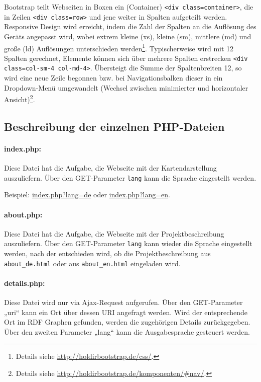 \documentclass[11pt,a4paper]{article}
\begin{document}
Bootstrap teilt Webseiten in Boxen ein (Container) \texttt{<div
  class={\dq}container{\dq}>}, die in Zeilen \texttt{<div class={\dq}row{\dq}>}
und jene weiter in Spalten aufgeteilt werden.  Responsive Design wird erreicht,
indem die Zahl der Spalten an die Auflösung des Geräts angepasst wird, wobei
extrem kleine (xs), kleine (sm), mittlere (md) und große (ld) Auflösungen
unterschieden werden\footnote{Details siehe
  \url{http://holdirbootstrap.de/css/}.}.  Typischerweise wird mit 12 Spalten
gerechnet, Elemente können sich über mehrere Spalten erstrecken \texttt{<div
  class={\dq}col-sm-4 col-md-4{\dq}>}. Übersteigt die Summe der Spaltenbreiten
12, so wird eine neue Zeile begonnen bzw. bei Navigationsbalken dieser in ein
Dropdown-Menü umgewandelt (Wechsel zwischen minimierter und horizontaler
Ansicht)\footnote{Details siehe
  \url{http://holdirbootstrap.de/komponenten/#nav/}.}.

\subsection{Beschreibung der einzelnen PHP-Dateien}
\paragraph{index.php:} 
Diese Datei hat die Aufgabe, die Webseite mit der Kartendarstellung
auszuliefern.  Über den GET-Parameter \texttt{lang} kann die Sprache eingestellt
werden. 

Beispiel: \url{index.php?lang=de} oder \url{index.php?lang=en}.

\paragraph{about.php:} 
Diese Datei hat die Aufgabe, die Webseite mit der Projektbeschreibung
auszuliefern.  Über den GET-Parameter \texttt{lang} kann wieder die Sprache
eingestellt werden, nach der entschieden wird, ob die Projektbeschreibung aus
\texttt{about\_de.html} oder aus \texttt{about\_en.html} eingeladen wird.

\paragraph{details.php:} 
Diese Datei wird nur via Ajax-Request aufgerufen. Über den GET-Parameter „uri“
kann ein Ort über dessen URI angefragt werden. Wird der entsprechende Ort im
RDF Graphen gefunden, werden die zugehörigen Details zurückgegeben. Über den
zweiten Parameter „lang“ kann die Ausgabesprache gesteuert werden.  
\end{document}
